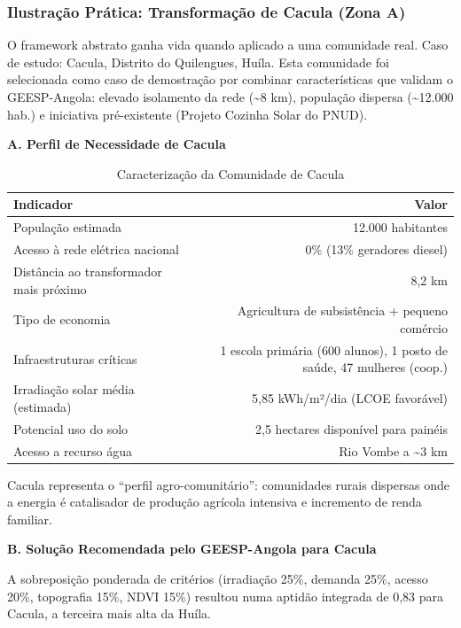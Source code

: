 \documentclass[12pt, a4paper]{article}
\begin{document}
\subsubsection{Ilustração Prática: Transformação de Cacula (Zona A)}

O framework abstrato ganha vida quando aplicado a uma comunidade real. Caso de estudo: 
Cacula, Distrito do Quilengues, Huíla. Esta comunidade foi selecionada como caso de 
demostração por combinar características que validam o GEESP-Angola: elevado isolamento 
da rede (\textasciitilde{}8 km), população dispersa (\textasciitilde{}12.000 hab.) e iniciativa pré-existente (Projeto 
Cozinha Solar do PNUD).

\textbf{A. Perfil de Necessidade de Cacula}

\begin{table}[H]
\centering
\caption{Caracterização da Comunidade de Cacula}
\label{Tab:2}
\small
\begin{tabular}{lr}
\toprule
\rowcolor{LightBlue}\textbf{Indicador} & \textbf{Valor} \\
\midrule
População estimada & 12.000 habitantes \\
Acesso à rede elétrica nacional & 0\% (13\% geradores diesel) \\
Distância ao transformador mais próximo & 8,2 km \\
Tipo de economia & Agricultura de subsistência + pequeno comércio \\
Infraestruturas críticas & 1 escola primária (600 alunos), 1 posto de saúde, 47 mulheres (coop.) \\
Irradiação solar média (estimada) & 5,85 kWh/m²/dia (LCOE favorável) \\
Potencial uso do solo & 2,5 hectares disponível para painéis \\
Acesso a recurso água & Rio Vombe a \textasciitilde{}3 km \\
\bottomrule
\end{tabular}
\end{table}

Cacula representa o ``perfil agro-comunitário'': comunidades rurais dispersas onde a energia 
é catalisador de produção agrícola intensiva e incremento de renda familiar.

\textbf{B. Solução Recomendada pelo GEESP-Angola para Cacula}

A sobreposição ponderada de critérios (irradiação 25\%, demanda 25\%, acesso 20\%, 
topografia 15\%, NDVI 15\%) resultou numa aptidão integrada de 0,83 para Cacula, a terceira 
mais alta da Huíla.
\end{document}
